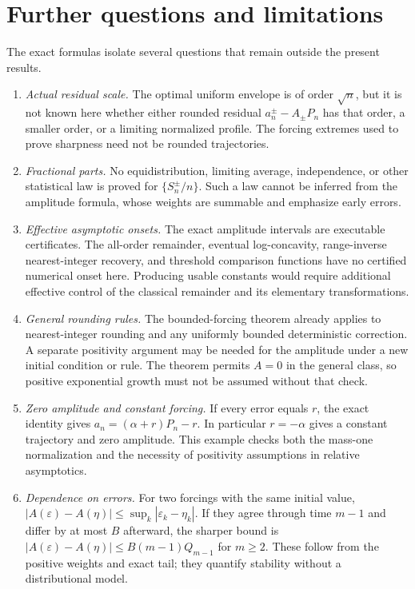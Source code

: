 \documentclass[11pt]{article}
\theoremstyle{remark}\newtheorem{remark}[theorem]{Remark}
\newcommand{\eps}{\varepsilon}
\begin{document}
\section{Further questions and limitations}\label{rrm:sec:questions}
The exact formulas isolate several questions that remain outside the present results.
\begin{enumerate}
\item \emph{Actual residual scale.} The optimal uniform envelope is of order $\sqrt n$, but it is not known here whether either rounded residual $a_n^\pm-A_\pm P_n$ has that order, a smaller order, or a limiting normalized profile. The forcing extremes used to prove sharpness need not be rounded trajectories.
\item \emph{Fractional parts.} No equidistribution, limiting average, independence, or other statistical law is proved for $\{S_n^\pm/n\}$. Such a law cannot be inferred from the amplitude formula, whose weights are summable and emphasize early errors.
\item \emph{Effective asymptotic onsets.} The exact amplitude intervals are executable certificates. The all-order remainder, eventual log-concavity, range-inverse nearest-integer recovery, and threshold comparison functions have no certified numerical onset here. Producing usable constants would require additional effective control of the classical remainder and its elementary transformations.
\item \emph{General rounding rules.} The bounded-forcing theorem already applies to nearest-integer rounding and any uniformly bounded deterministic correction. A separate positivity argument may be needed for the amplitude under a new initial condition or rule. The theorem permits $A=0$ in the general class, so positive exponential growth must not be assumed without that check.
\item \emph{Zero amplitude and constant forcing.} If every error equals $r$, the exact identity gives $a_n=(\alpha+r)P_n-r$. In particular $r=-\alpha$ gives a constant trajectory and zero amplitude. This example checks both the mass-one normalization and the necessity of positivity assumptions in relative asymptotics.
\item \emph{Dependence on errors.} For two forcings with the same initial value, $|A(\eps)-A(\eta)|\le\sup_k|\eps_k-\eta_k|$. If they agree through time $m-1$ and differ by at most $B$ afterward, the sharper bound is $|A(\eps)-A(\eta)|\le B(m-1)Q_{m-1}$ for $m\ge2$. These follow from the positive weights and exact tail; they quantify stability without a distributional model.
\end{enumerate}
\end{document}
